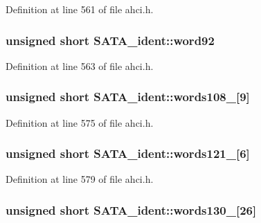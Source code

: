 Definition at line 561 of file ahci.\+h.

\subsubsection[{\texorpdfstring{word92}{word92}}]{\setlength{\rightskip}{0pt plus 5cm}unsigned short S\+A\+T\+A\+\_\+ident\+::word92}\hypertarget{structSATA__ident_a8fb2a1e3cc82865443fa41f666ebe88b}{}\label{structSATA__ident_a8fb2a1e3cc82865443fa41f666ebe88b}


Definition at line 563 of file ahci.\+h.

\subsubsection[{\texorpdfstring{words108\+\_\+116}{words108_116}}]{\setlength{\rightskip}{0pt plus 5cm}unsigned short S\+A\+T\+A\+\_\+ident\+::words108\+\_\mbox{[}9\mbox{]}}\hypertarget{structSATA__ident_a11cabfdf0f71c170262978bb08445d3a}{}\label{structSATA__ident_a11cabfdf0f71c170262978bb08445d3a}


Definition at line 575 of file ahci.\+h.

\subsubsection[{\texorpdfstring{words121\+\_\+126}{words121_126}}]{\setlength{\rightskip}{0pt plus 5cm}unsigned short S\+A\+T\+A\+\_\+ident\+::words121\+\_\mbox{[}6\mbox{]}}\hypertarget{structSATA__ident_a50b9d23ab1fe7bd099651c205b273ddc}{}\label{structSATA__ident_a50b9d23ab1fe7bd099651c205b273ddc}


Definition at line 579 of file ahci.\+h.

\subsubsection[{\texorpdfstring{words130\+\_\+155}{words130_155}}]{\setlength{\rightskip}{0pt plus 5cm}unsigned short S\+A\+T\+A\+\_\+ident\+::words130\+\_\mbox{[}26\mbox{]}}\hypertarget{structSATA__ident_ab65ec26c6dc0d14d5c7bd8981ec68d74}{}\label{structSATA__ident_ab65ec26c6dc0d14d5c7bd8981ec68d74}


